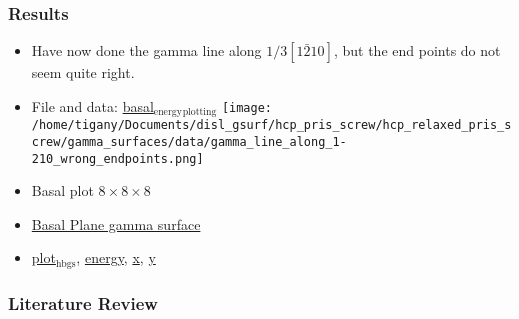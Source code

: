 \documentclass[11pt]{article}
\begin{document}
\subsubsection{Results}
\label{sec-2-4-4}
\begin{itemize}
\item Have now done the gamma line along $1/3[1\bar{2}10]$, but the end points
do not seem quite right.
\item File and data: \href{file:///home/tigany/Documents/disl_gsurf/hcp_pris_screw/hcp_relaxed_pris_screw/gamma_surfaces/data/plot_hsbc_pkl.py}{basal$_{\text{energy}}$$_{\text{plotting}}$} \texttt{[image: /home/tigany/Documents/disl\_gsurf/hcp\_pris\_screw/hcp\_relaxed\_pris\_screw/gamma\_surfaces/data/gamma\_line\_along\_1-210\_wrong\_endpoints.png]}
\item Basal plot $8\times 8\times 8$
\item \href{file:///home/tigany/Documents/disl_gsurf/hcp_pris_screw/hcp_relaxed_pris_screw/gamma_surfaces/data/supercell_8-8-8/Figures/gamma_surface_8-8-8_basal_tbe.png}{Basal Plane gamma surface}
\item \href{file:///home/tigany/Documents/disl_gsurf/hcp_pris_screw/hcp_relaxed_pris_screw/gamma_surfaces/data/supercell_8-8-8/plot_hsbc_pkl.py}{plot$_{\text{hbgs}}$}, \href{file:///home/tigany/Documents/disl_gsurf/hcp_pris_screw/hcp_relaxed_pris_screw/gamma_surfaces/data/supercell_8-8-8/hgsBte888.pkl}{energy}, \href{file:///home/tigany/Documents/disl_gsurf/hcp_pris_screw/hcp_relaxed_pris_screw/gamma_surfaces/data/supercell_8-8-8/hgsBtx888.pkl\%20}{x}, \href{file:///home/tigany/Documents/disl_gsurf/hcp_pris_screw/hcp_relaxed_pris_screw/gamma_surfaces/data/supercell_8-8-8/hgsBty888.pkl\%20}{y}
\end{itemize}


\subsubsection{Literature Review}
\label{sec-2-4-5}
\end{document}
